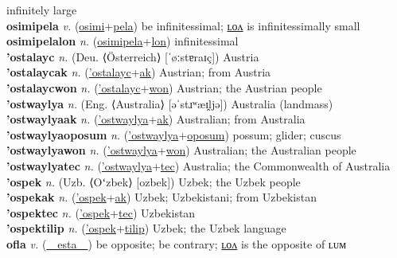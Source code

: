 infinitely large \label{osimimotalon} \\
\textbf{osimipela} \textit{v.} (\hyperref[osimi]{osimi}+\hyperref[pela]{pela})
be infinitessimal; \hyperref[osimipelalon]{ʟᴏᴧ} is infinitessimally small \label{osimipela} \\
\textbf{osimipelalon} \textit{n.} (\hyperref[osimipela]{osimipela}+\hyperref[lon]{lon})
infinitessimal \label{osimipelalon} \\
\textbf{'ostalayc} \textit{n.} (Deu. ⟨Österreich⟩ [ˈøːstɐraɪç])
Austria \label{'ostalayc} \\
\textbf{'ostalaycak} \textit{n.} (\hyperref['ostalayc]{'ostalayc}+\hyperref[ak]{ak})
Austrian; from Austria \label{'ostalaycak} \\
\textbf{'ostalaycwon} \textit{n.} (\hyperref['ostalayc]{'ostalayc}+\hyperref[won]{won})
Austrian; the Austrian people \label{'ostalaycwon} \\
\textbf{'ostwaylya} \textit{n.} (Eng. ⟨Australia⟩ [əˈstɹʷæɪ̯ljə])
Australia (landmass) \label{'ostwaylya} \\
\textbf{'ostwaylyaak} \textit{n.} (\hyperref['ostwaylya]{'ostwaylya}+\hyperref[ak]{ak})
Australian; from Australia \label{'ostwaylyaak} \\
\textbf{'ostwaylyaoposum} \textit{n.} (\hyperref['ostwaylya]{'ostwaylya}+\hyperref[oposum]{oposum})
possum; glider; cuscus \label{'ostwaylyaoposum} \\
\textbf{'ostwaylyawon} \textit{n.} (\hyperref['ostwaylya]{'ostwaylya}+\hyperref[won]{won})
Australian; the Australian people \label{'ostwaylyawon} \\
\textbf{'ostwaylyatec} \textit{n.} (\hyperref['ostwaylya]{'ostwaylya}+\hyperref[tec]{tec})
Australia; the Commonwealth of Australia \label{'ostwaylyatec} \\
\textbf{'ospek} \textit{n.} (Uzb. ⟨Oʻzbek⟩ [ozbek])
Uzbek; the Uzbek people \label{'ospek} \\
\textbf{'ospekak} \textit{n.} (\hyperref['ospek]{'ospek}+\hyperref[ak]{ak})
Uzbek; Uzbekistani; from Uzbekistan \label{'ospekak} \\
\textbf{'ospektec} \textit{n.} (\hyperref['ospek]{'ospek}+\hyperref[tec]{tec})
Uzbekistan \label{'ospektec} \\
\textbf{'ospektilip} \textit{n.} (\hyperref['ospek]{'ospek}+\hyperref[tilip]{tilip})
Uzbek; the Uzbek language \label{'ospektilip} \\
\textbf{ofla} \textit{v.} (\hyperref[esta]{~~esta~~})
be opposite; be contrary; \hyperref[oflalon]{ʟᴏᴧ} is the opposite of ʟᴜᴍ \label{ofla} \\
